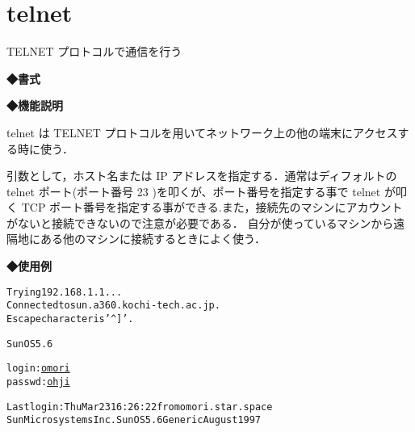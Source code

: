 
\section{telnet}
TELNET プロトコルで通信を行う\par
\label{cmd:telnet}
\noindent
{\bf ◆書式}
\begin{center}
\begin{screen}
\begin{alltt}
% telnet [ホスト名 or IPアドレス] [ ポート番号 ]
\end{alltt}
\end{screen}
\end{center}

\noindent
{\bf ◆機能説明}

telnet は TELNET プロトコルを用いてネットワーク上の他の端末にアクセスする時に使う．\par
引数として，ホスト名または IP アドレスを指定する．通常はディフォルトの telnet ポート(ポート番号 23 )を叩くが、ポート番号を指定する事で telnet が叩く TCP ポート番号を指定する事ができる.また，接続先のマシンにアカウントがないと接続できないので注意が必要である．
自分が使っているマシンから遠隔地にある他のマシンに接続するときによく使う．

\noindent
{\bf ◆使用例}
\begin{center}
\begin{breakbox}
\begin{alltt}
% \underline{telnet sun}
Trying 192.168.1.1...
Connected to sun.a360.kochi-tech.ac.jp.
Escape character is '^]'.

SunOS 5.6

login: \underline{omori}
passwd: \underline{ohji}

Last login: Thu Mar 23 16:26:22 from omori.star.space
Sun Microsystems Inc.   SunOS 5.6       Generic August 1997
% 
\end{alltt}
\end{breakbox}
\end{center}
\clearpage
